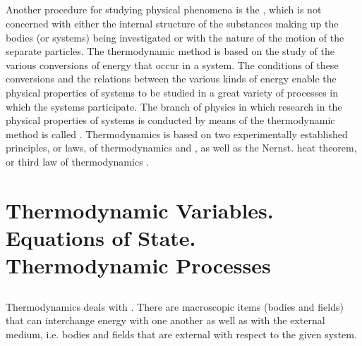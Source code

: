 \subsection{}\label{8.2.3} Another procedure for studying physical phenomena is the , which is not concerned with either the internal structure of the substances making up the bodies (or systems) being investigated or with the nature of the motion of the separate particles. The thermodynamic method is based on the study of the various conversions of energy that occur in a system. The conditions of these conver­sions and the relations between the various kinds of energy enable the physical properties of systems to be studied in a great variety of processes in which the systems participate. The branch of physics in which research in the physical properties of systems is conducted by means of the thermodynamic method is called . Thermodynamics is based on two experimentally established principles, or laws, of thermodynamics  and , as well as the Nernst. heat theorem, or third law of thermodynamics .

\clearpage

\section[Thermodynamic Variables]{Thermodynamic Variables. Equations of State. Thermodynamic Processes}
\label{sec-8.3}

\subsection{}\label{8.3.1} Thermodynamics deals with . There are macroscopic items (bodies and fields) that can interchange energy with one another as well as with the external medium, i.e. bodies and fields that are external with respect to the given system.

